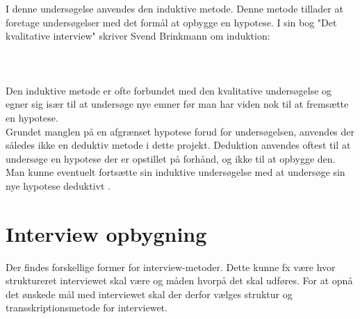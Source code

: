 \\
\\ 
I denne undersøgelse anvendes den induktive metode. Denne metode tillader at foretage undersøgelser med det formål at opbygge en hypotese. 
I sin bog "Det kvalitative interview" skriver Svend Brinkmann om induktion:
\\
\\
 \citep{brinkmann2014}
\\
\\
Den induktive metode er ofte forbundet med den kvalitative undersøgelse og egner sig især til at undersøge nye emner før man har viden nok til at fremsætte en hypotese. 
\\
Grundet manglen på en afgrænset hypotese forud for undersøgelsen, anvendes der således ikke en deduktiv metode i dette projekt. Deduktion anvendes oftest til at undersøge en hypotese der er opstillet på forhånd, og ikke til at opbygge den. Man kunne eventuelt fortsætte sin induktive undersøgelse med at undersøge sin nye hypotese deduktivt \cite{deduktiv}.



\section{Interview opbygning}
Der findes forskellige former for interview-metoder. Dette kunne fx være hvor struktureret interviewet skal være og måden hvorpå det skal udføres. For at opnå det ønskede mål med interviewet skal der derfor vælges struktur og transskriptionsmetode for interviewet.

